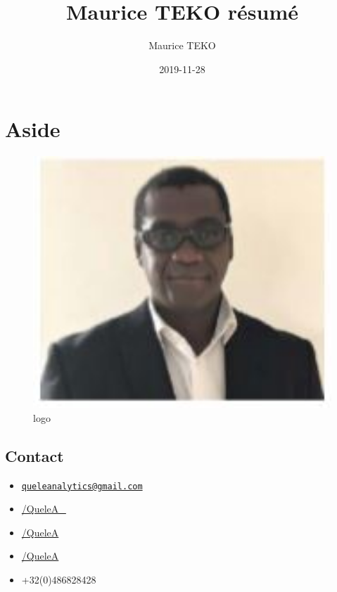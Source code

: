 \documentclass[]{article}
\title{Maurice TEKO résumé}
\author{Maurice TEKO}
\date{2019-11-28}
\providecommand{\tightlist}{%
  \setlength{\itemsep}{0pt}\setlength{\parskip}{0pt}}
\begin{document}
\maketitle

\hypertarget{aside}{%
\section{Aside}\label{aside}}

\begin{figure}
\centering
\includegraphics[width=1\textwidth,height=\textheight]{me.JPG}
\caption{logo}
\end{figure}

\hypertarget{contact}{%
\subsection{Contact}\label{contact}}

\begin{itemize}
\tightlist
\item
  \href{mailto:queleanalytics@gmail.com}{\nolinkurl{queleanalytics@gmail.com}}
\item
  \href{https://twitter.com/MauriceDataLab}{/QueleA\_ }
\item
  \href{https://github.com/tekomaurice}{/QueleA }
\item
  \href{https://github.com/tekomaurice/queleanalytics-io-site/}{/QueleA
  }
\item
  +32(0)486828428
\end{itemize}
\end{document}
